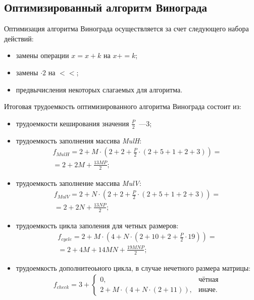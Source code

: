 \subsection*{Оптимизированный алгоритм Винограда}
Оптимизация алгоритма Винограда осуществляется за счет следующего набора действий:
\begin{itemize}
	\item замены операции $x = x + k$ на $x += k$;
	\item замены $\cdot 2$ на $<<$;
	\item предвычисления некоторых слагаемых для алгоритма.
\end{itemize}
Итоговая трудоемкость оптимизированного алгоритма Винограда состоит из:
\begin{itemize}
	\item трудоемкости кеширования значения $\frac{P}{2}$~---3;
	\item трудоемкость заполнения массива \textit{MulH}:
	\begin{equation}
		\begin{gathered}
			f_{MulH} = 2 + M \cdot (2 + 2 + \frac{P}{2} \cdot (2 + 5 + 1 + 2 + 3)) = \\
			= 2 + 2M + \frac{13MP}{2};
		\end{gathered}
	\end{equation}
	\item трудоемкость заполнение массива \textit{MulV}:
	\begin{equation}
		\begin{gathered}
			f_{MulV} = 2 + N \cdot (2 + 2 + \frac{P}{2} \cdot (2 + 5 + 1 + 2 + 3)) = \\
			= 2 + 2N + \frac{13NP}{2};
		\end{gathered}
	\end{equation}
	\item трудоемкость цикла заполения для четных размеров:
	\begin{equation}
		\begin{gathered}
			f_{cycle} = 2 + M \cdot (4 + N \cdot (2 + 10 + 2 + \frac{P}{2} \cdot 19)) = \\
			= 2 + 4M + 14MN + \frac{19MNP}{2};
		\end{gathered}
	\end{equation}
	\item трудоемкость дополнитеоьного цикла, в случае нечетного размера матрицы:
	\begin{equation}
		\begin{gathered}
			f_{check} = 3 + 
			\begin{cases}
				0, & \text{чётная} \\
				2 + M \cdot (4 + N \cdot (2 + 11)), & \text{иначе}.
			\end{cases}
		\end{gathered}  
	\end{equation}
\end{itemize}
